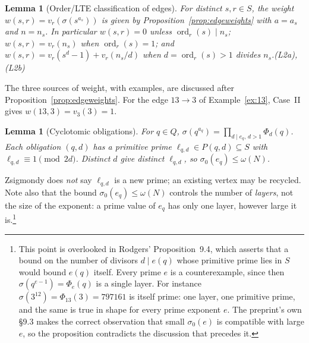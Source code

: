 \documentclass[11pt]{article}
\newtheorem{lemma}[theorem]{Lemma}
\theoremstyle{definition}
\theoremstyle{remark}
\DeclareMathOperator{\ord}{ord}
\begin{document}
\begin{lemma}[Order/LTE classification of edges]\label{lem:L2}
For distinct $s,r\in S$, the weight $w(s,r)=v_r(\sigma(s^{a_s}))$ is given by
Proposition~\ref{prop:edgeweights} with $a=a_s$ and $n=n_s$.  In particular
$w(s,r)=0$ unless $\ord_r(s)\mid n_s$; $w(s,r)=v_r(n_s)$ when
$\ord_r(s)=1$; and $w(s,r)=v_r(s^d-1)+v_r(n_s/d)$ when $d=\ord_r(s)>1$
divides $n_s$.\hfill(L2a), (L2b)
\end{lemma}

The three sources of weight, with examples, are discussed after
Proposition~\ref{prop:edgeweights}.  For the edge $13\to3$ of
Example~\ref{ex:13}, Case~II gives $w(13,3)=v_3(3)=1$.

\begin{lemma}[Cyclotomic obligations]\label{lem:L3}
For $q\in Q$, $\sigma(q^{a_q})=\prod_{d\mid e_q,\,d>1}\Phi_d(q)$. Each
obligation $(q,d)$ has a primitive prime $\ell_{q,d}\in P(q,d)\subseteq S$
with $\ell_{q,d}\equiv 1\pmod{2d}$. Distinct $d$ give distinct
$\ell_{q,d}$, so $\sigma_0(e_q)\le\omega(N)$.
\end{lemma}

Zsigmondy does \emph{not} say $\ell_{q,d}$ is a new prime; an existing
vertex may be recycled.  Note also that the bound $\sigma_0(e_q)\le\omega(N)$
controls the number of \emph{layers}, not the size of the exponent: a prime
value of $e_q$ has only one layer, however large it is.\footnote{This point
is overlooked in Rodgers' Proposition~9.4, which asserts that a bound on the
number of divisors $d\mid e(q)$ whose primitive prime lies in $S$ would bound
$e(q)$ itself.  Every prime $e$ is a counterexample, since then
$\sigma(q^{e-1})=\Phi_e(q)$ is a single layer.  For instance
$\sigma(3^{12})=\Phi_{13}(3)=797161$ is itself prime: one layer, one primitive
prime, and the same is true in shape for every prime exponent $e$.  The
preprint's own \S9.3 makes the correct observation that small $\sigma_0(e)$ is
compatible with large $e$, so the proposition contradicts the discussion that
precedes it.}
\end{document}
